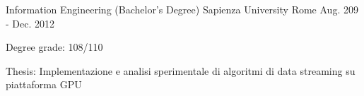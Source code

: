 

\begin{cventries}

  \cventry
    {Information Engineering (Bachelor's Degree)} %
    {Sapienza University} %
    {Rome} %
    {Aug. 209 - Dec. 2012} %
    {
      \begin{cvitems} %
        \item {Degree grade: 108/110}
        \item {Thesis: Implementazione e analisi sperimentale di algoritmi di data streaming su piattaforma GPU}
      \end{cvitems}
    }

\end{cventries}
